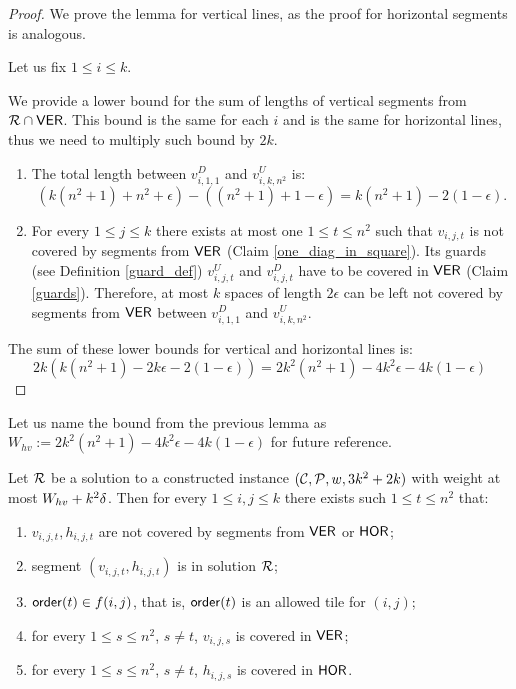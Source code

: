 \begin{proof}
We prove the lemma for vertical lines,
as the proof for horizontal segments is analogous.

Let us fix $1 \le i \le k$.

We provide a lower bound for the sum of lengths
of vertical segments from $\mathcal{R} \cap \mathsf{VER}$.
This bound is the same for each $i$ and is the same
for horizontal lines, thus we need to multiply such bound by $2k$.

\begin{enumerate}[label={(\arabic*)}]
\item The total length between $v^D_{i, 1, 1}$ and $v^U_{i, k, n^2}$ is:
$$(k(n^2+1) + n^2 +\epsilon) - ((n^2+1)+1 -\epsilon) = k(n^2+1) - 2(1 - \epsilon).$$

\item For every $1 \le j \le k$ there exists at most one $1 \le t \le n^2$
such that $v_{i,j,t}$ is not covered by segments from $\mathsf{VER}$
(Claim \ref{one_diag_in_square}).
Its guards (see Definition \ref{guard_def}) $v^U_{i,j,t}$ and $v^D_{i,j,t}$
have to be covered in $\mathsf{VER}$ (Claim \ref{guards}).
Therefore, at most $k$ spaces of length $2\epsilon$ can be left
not covered by segments from $\mathsf{VER}$ between $v_{i,1,1}^D$ and $v_{i,k,n^2}^U$.

\end{enumerate}
The sum of these lower bounds for vertical and horizontal lines is:
$$2k(k(n^2+1) -2k\epsilon -2(1-\epsilon)) = 2k^2(n^2+1) -4k^2\epsilon -4k(1-\epsilon)$$
\end{proof}

Let us name the bound from the previous lemma
as $W_{hv} := 2k^2(n^2+1) -4k^2\epsilon -4k(1-\epsilon)$
for future reference.

\begin{lemma}
\label{diag_correct}
Let $\mathcal{R}$ be a solution to a constructed instance $(\mathcal{C}, \mathcal{P}, w, 3k^2+2k)$
with weight at most  $W_{hv} +k^2\delta$.
Then for every $1 \le i,j \le k$
there exists such $1 \le t \le n^2$ that:
\begin{enumerate}[label={(\arabic*)}]
\item $v_{i,j,t}, h_{i,j,t}$ are not covered by segments from $\mathsf{VER}$ or $\mathsf{HOR}$;
\item segment $(v_{i,j,t}, h_{i,j,t})$ is in solution $\mathcal{R}$;
\item $\mathsf{order}(t) \in f(i,j)$, that is, $\mathsf{order}(t)$ is an allowed tile for $(i,j)$;
\item for every $1 \le s\le n^2$, $s \neq t$, $v_{i,j,s}$ is covered in $\mathsf{VER}$;
\item for every $1 \le s\le n^2$, $s \neq t$, $h_{i,j,s}$ is covered in $\mathsf{HOR}$.
\end{enumerate}
\end{lemma}

